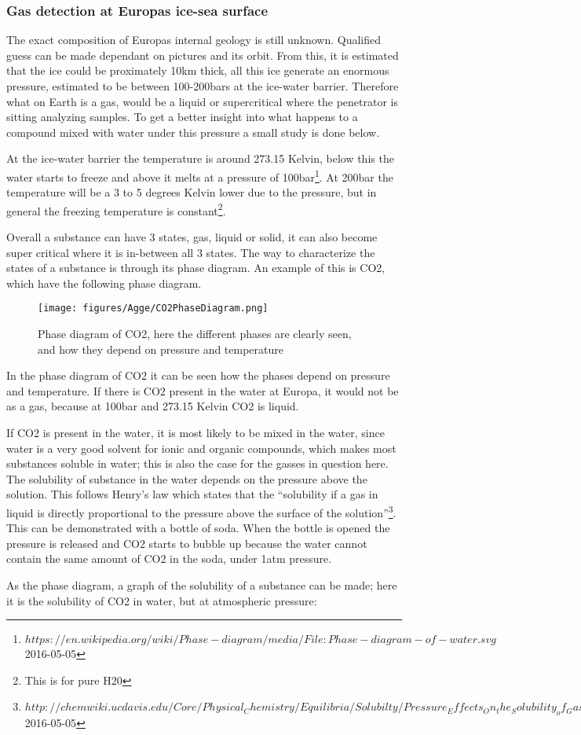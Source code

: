\documentclass[10pt,a4paper,draft]{report}
\begin{document}
\subsubsection{Gas detection at Europas ice-sea surface}
The exact composition of Europas internal geology is still unknown. Qualified guess can be made dependant on pictures and its orbit. From this, it is estimated that the ice could be proximately 10km thick, all this ice generate an enormous pressure, estimated to be between 100-200bars at the ice-water barrier. Therefore what on Earth is a gas, would be a liquid or supercritical where the penetrator is sitting analyzing samples. To get a better insight into what happens to a compound mixed with water under this pressure a small study is done below.\par
At the ice-water barrier the temperature is around 273.15 Kelvin, below this the water starts to freeze and above it melts at a pressure of 100bar\footnote{$https://en.wikipedia.org/wiki/Phase-diagram/media/File:Phase-diagram-of-water.svg$ 2016-05-05}. At 200bar the temperature will be a 3 to 5 degrees Kelvin lower due to the pressure, but in general the freezing temperature is constant\footnote{This is for pure H20}. \par
Overall a substance can have 3 states, gas, liquid or solid, it can also become super critical where it is in-between all 3 states. The way to characterize the states of a substance is through its phase diagram. An example of this is CO2, which have the following phase diagram.\par

\begin{figure}[H]
\caption{Phase diagram of CO2, here the different phases are clearly seen, and how they depend on pressure and temperature}
\centering
\texttt{[image: figures/Agge/CO2PhaseDiagram.png]}  
\end{figure}

In the phase diagram of CO2 it can be seen how the phases depend on pressure and temperature. If there is CO2 present in the water at Europa, it would not be as a gas, because at 100bar and 273.15 Kelvin CO2 is liquid. \par
If CO2 is present in the water, it is most likely to be mixed in the water, since water is a very good solvent for ionic and organic compounds, which makes most substances soluble in water; this is also the case for the gasses in question here. The solubility of substance in the water depends on the pressure above the solution. This follows Henry’s law which states that the “solubility if a gas in liquid is directly proportional to the pressure above the surface of the solution”\footnote{$http://chemwiki.ucdavis.edu/Core/Physical_Chemistry/Equilibria/Solubilty/Pressure_Effects_On_the_Solubility_of_Gases$ 2016-05-05}. 
This can be demonstrated with a bottle of soda. When the bottle is opened the pressure is released and CO2 starts to bubble up because the water cannot contain the same amount of CO2 in the soda, under 1atm pressure.\par
As the phase diagram, a graph of the solubility of a substance can be made; here it is the solubility of CO2 in water, but at atmospheric pressure:\par
\end{document}
